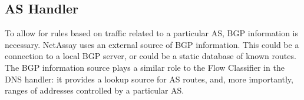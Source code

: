 \documentclass{sig-alternate}
\newcommand\tti[1]{\small\texttt{#1}\normalsize}
\newcommand\system{NetAssay}
\begin{document}
\begin{comment}



\end{comment}

\subsection{AS Handler}
To allow for rules based on traffic related to a particular AS, BGP information is necessary. \system{} uses an external source of BGP information. This could be a connection to a local BGP server, or could be a static database of known routes. The BGP information source plays a similar role to the Flow Classifier in the DNS handler: it provides a lookup source for AS routes, and, more importantly, ranges of addresses controlled by a particular AS.
\end{document}
